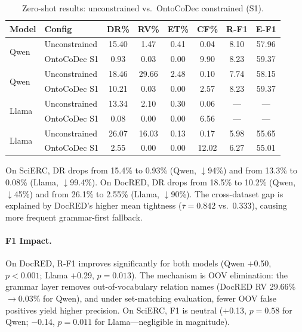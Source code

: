 \documentclass[11pt,a4paper]{article}
\newcommand{\sys}{OntoCoDec}
\newcommand{\pp}{\text{pp}}
\begin{document}
\begin{table}[t]
\centering
\small
\caption{Zero-shot results: unconstrained vs.\ \sys{} constrained (S1).}
\label{tab:zeroshot-results}
\begin{tabular}{llcccccc}
\toprule
\textbf{Model} & \textbf{Config} & \textbf{DR\%} & \textbf{RV\%} & \textbf{ET\%} & \textbf{CF\%} & \textbf{R-F1} & \textbf{E-F1} \\
\midrule
\multirow{2}{*}{Qwen} & Unconstrained & 15.40 & 1.47 & 0.41 & 0.04 & 8.10 & 57.96 \\
 & \sys{} S1 & 0.93 & 0.03 & 0.00 & 9.90 & 8.23 & 59.37 \\
\midrule
\multirow{2}{*}{Qwen} & Unconstrained & 18.46 & 29.66 & 2.48 & 0.10 & 7.74 & 58.15 \\
 & \sys{} S1 & 10.21 & 0.03 & 0.00 & 2.57 & 8.23 & 59.37 \\
\midrule
\multirow{2}{*}{Llama} & Unconstrained & 13.34 & 2.10 & 0.30 & 0.06 & --- & --- \\
 & \sys{} S1 & 0.08 & 0.00 & 0.00 & 6.56 & --- & --- \\
\midrule
\multirow{2}{*}{Llama} & Unconstrained & 26.07 & 16.03 & 0.13 & 0.17 & 5.98 & 55.65 \\
 & \sys{} S1 & 2.55 & 0.00 & 0.00 & 12.02 & 6.27 & 55.01 \\
\bottomrule
\end{tabular}
\end{table}

On SciERC, DR drops from 15.4\% to 0.93\% (Qwen, $\downarrow$94\%) and from 13.3\% to 0.08\% (Llama, $\downarrow$99.4\%).
On DocRED, DR drops from 18.5\% to 10.2\% (Qwen, $\downarrow$45\%) and from 26.1\% to 2.55\% (Llama, $\downarrow$90\%).
The cross-dataset gap is explained by DocRED's higher mean tightness ($\bar{\tau}=0.842$ vs.\ $0.333$), causing more frequent grammar-first fallback.

\paragraph{F1 Impact.}
On DocRED, R-F1 improves significantly for both models (Qwen $+$0.50\pp{}, $p<0.001$; Llama $+$0.29\pp{}, $p=0.013$).
The mechanism is OOV elimination: the grammar layer removes out-of-vocabulary relation names (DocRED RV 29.66\%$\rightarrow$0.03\% for Qwen), and under set-matching evaluation, fewer OOV false positives yield higher precision.
On SciERC, F1 is neutral ($+$0.13\pp{}, $p=0.58$ for Qwen; $-$0.14\pp{}, $p=0.011$ for Llama---negligible in magnitude).
\end{document}
